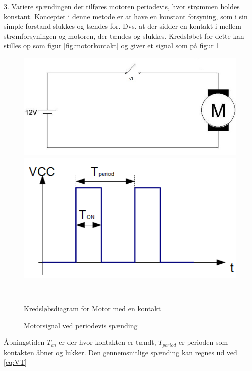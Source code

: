 

3. Variere spændingen der tilføres motoren periodevis, hvor strømmen holdes konstant.
Konceptet i denne metode er at have en konstant forsyning, som i sin simple forstand slukkes og tændes for. Dvs. at der sidder en kontakt i mellem strømforsyningen og motoren, der tændes og slukkes. Kredsløbet for dette kan stilles op som figur \ref{fig:motorkontakt} og giver et signal som på figur \ref{fig:onoffwave}

 \begin{figure}[htbp] \centering
\begin{minipage}[b]{0.48\textwidth} \centering
\includegraphics[width=1.00\textwidth]{billeder/Hardware/motorkontakt.jpg} %
\end{minipage} \hfill
\begin{minipage}[b]{0.48\textwidth} \centering
\includegraphics[width=1.00\textwidth]{billeder/Hardware/onoffwave.jpg} %
\end{minipage} \\ %
\begin{minipage}[t]{0.48\textwidth}
\caption{Kredsløbsdiagram for Motor med en kontakt} %
\label{fig:motorkontakt}
\end{minipage} \hfill
\begin{minipage}[t]{0.48\textwidth}
\caption{Motorsignal ved periodevis spænding } %
\label{fig:onoffwave}
\end{minipage}
\end{figure}
Åbningstiden $T_{on}$ er der hvor kontakten er tændt, $T_{period}$ er perioden som kontakten åbner og lukker. Den gennemsnitlige spænding kan regnes ud ved \ref{eq:VT}

